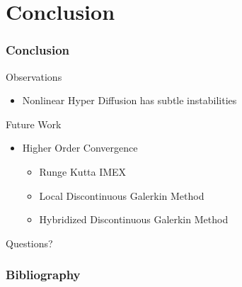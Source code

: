 \documentclass[10pt]{beamer}
\begin{document}
  \section{Conclusion}
    \begin{frame}
      \frametitle{Conclusion}
      Observations
      \begin{itemize}
        \item Nonlinear Hyper Diffusion has subtle instabilities
      \end{itemize}
      Future Work
      \begin{itemize}
        \item Higher Order Convergence
          \begin{itemize}
            \item Runge Kutta IMEX
            \item Local Discontinuous Galerkin Method
            \item Hybridized Discontinuous Galerkin Method
          \end{itemize}
      \end{itemize}
    \end{frame}

    \begin{frame}
      Questions?
    \end{frame}

    \begin{frame}[allowframebreaks]
      \frametitle{Bibliography}
      \nocite{*}
      \printbibliography{}
    \end{frame}
\end{document}
